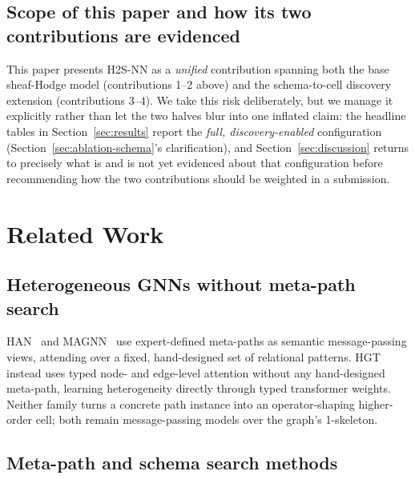 \documentclass{article}
\begin{document}
\subsection{Scope of this paper and how its two contributions are evidenced}

This paper presents H2S-NN as a \emph{unified} contribution spanning both the base sheaf-Hodge
model (contributions 1--2 above) and the schema-to-cell discovery extension (contributions 3--4).
We take this risk deliberately, but we manage it explicitly rather than let the two halves blur
into one inflated claim: the headline tables in Section~\ref{sec:results} report the \emph{full,
discovery-enabled} configuration (Section~\ref{sec:ablation-schema}'s clarification), and
Section~\ref{sec:discussion} returns to precisely what is and is not yet evidenced about that
configuration before recommending how the two contributions should be weighted in a submission.

\section{Related Work}
\label{sec:related}

\subsection{Heterogeneous GNNs without meta-path search}

HAN~\citep{wang2019han} and MAGNN~\citep{fu2020magnn} use expert-defined meta-paths as semantic
message-passing views, attending over a fixed, hand-designed set of relational patterns.
HGT~\citep{hu2020hgt} instead uses typed node- and edge-level attention without any hand-designed
meta-path, learning heterogeneity directly through typed transformer weights. Neither family turns
a concrete path instance into an operator-shaping higher-order cell; both remain message-passing
models over the graph's 1-skeleton.

\subsection{Meta-path and schema search methods}
\end{document}
